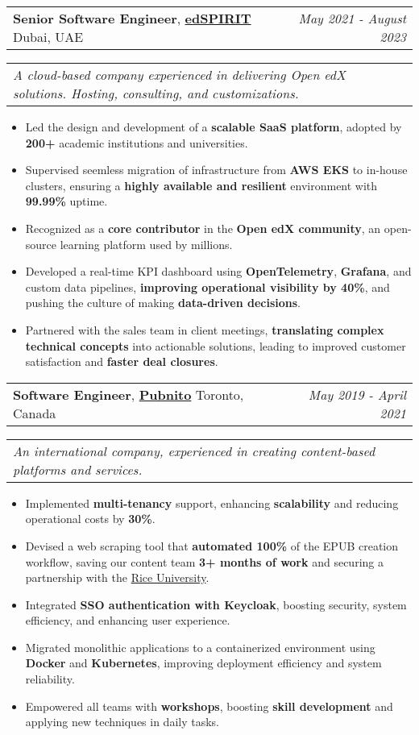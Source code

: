 \documentclass[letterpaper,11pt]{article}
\makeatletter
\newcommand{\resumeItemSimple}[1]{
  \item\small{
    {#1}
  }
}
\newcommand{\resumeSubheadingSimple}[5]{
  \vspace{-1pt}\item
    \begin{tabular*}{0.97\textwidth}[t]{l@{\extracolsep{\fill}}r}
      \textbf{#1}, \textbf{\href{#3}{#2}} \space \small#4 & \textit{\small #5} \\
    \end{tabular*}
}
\newcommand{\resumeSubSubheading}[2]{
    \begin{tabular*}{0.97\textwidth}{l@{\extracolsep{\fill}}r}
      \textit{\small#1} & \textit{\small #2} \\
    \end{tabular*}\vspace{-5pt}
}
\newcommand{\resumeItemListStart}{\begin{itemize}[itemsep=1pt, parsep=0pt]}
\newcommand{\resumeItemListEnd}{\end{itemize}\vspace{-3pt}}
\makeatother
\begin{document}
      \resumeSubheadingSimple
        {Senior Software Engineer}{edSPIRIT}{https://www.linkedin.com/company/edspirit-tech/}{Dubai, UAE}{May 2021 - August 2023}
        \resumeSubSubheading{A cloud-based company experienced in delivering Open edX solutions. Hosting, consulting, and customizations.}{}
        \resumeItemListStart
          \resumeItemSimple{Led the design and development of a \textbf{scalable SaaS platform}, adopted by \textbf{200+} academic institutions and universities.}
          \resumeItemSimple{Supervised seemless migration of infrastructure from \textbf{AWS EKS} to in-house clusters, ensuring a \textbf{highly available and resilient} environment with \textbf{99.99\%} uptime.}
          \resumeItemSimple{Recognized as a \textbf{core contributor} in the \textbf{Open edX community}, an open-source learning platform used by millions.}
          \resumeItemSimple{Developed a real-time KPI dashboard using \textbf{OpenTelemetry}, \textbf{Grafana}, and custom data pipelines, \textbf{improving operational visibility by 40\%}, and pushing the culture of making \textbf{data-driven decisions}.}
          \resumeItemSimple{Partnered with the sales team in client meetings, \textbf{translating complex technical concepts} into actionable solutions, leading to improved customer satisfaction and \textbf{faster deal closures}.}
        \resumeItemListEnd

      \resumeSubheadingSimple
        {Software Engineer}{Pubnito}{https://www.linkedin.com/company/pubnito/}{Toronto, Canada}{May 2019 - April 2021}
        \resumeSubSubheading{An international company, experienced in creating content-based platforms and services.}{}
        \resumeItemListStart
          \resumeItemSimple{Implemented \textbf{multi-tenancy} support, enhancing \textbf{scalability} and reducing operational costs by \textbf{30\%}.}
          \resumeItemSimple{Devised a web scraping tool that \textbf{automated 100\%} of the EPUB creation workflow, saving our content team \textbf{3+ months of work} and securing a partnership with the \href{https://www.rice.edu/}{Rice University}.}
          \resumeItemSimple{Integrated \textbf{SSO authentication with Keycloak}, boosting security, system efficiency, and enhancing user experience.}
          \resumeItemSimple{Migrated monolithic applications to a containerized environment using \textbf{Docker} and \textbf{Kubernetes}, improving deployment efficiency and system reliability.}
          \resumeItemSimple{Empowered all teams with \textbf{workshops}, boosting \textbf{skill development} and applying new techniques in daily tasks.}
        \resumeItemListEnd
\end{document}
